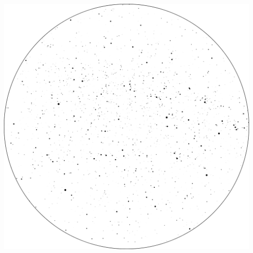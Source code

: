 \documentclass{./SAS-class-skygen}
\begin{document}
	\vspace{0.5cm}
    \begin{center}
    \includegraphics[width=\textwidth]{./pics/skychart1.png}
    \end{center}
    
    
\end{document}
